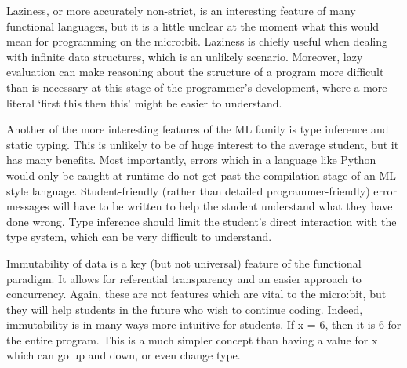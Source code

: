 \documentclass[12pt, a4paper]{report}
\begin{document}
Laziness, or more accurately non-\gls{strict}, is an interesting feature of many functional languages, 
but it is a little unclear at the moment what this would mean for programming on the micro:bit. 
Laziness is chiefly useful when dealing with infinite data structures, which is an unlikely
scenario. Moreover, lazy evaluation can make reasoning about the structure of a program more
difficult than is necessary at this stage of the programmer's development, where a more literal
`first this then this' might be easier to understand. 

Another of the more interesting features of the ML family is type inference and static typing.
This is unlikely to be of huge interest to the average student, but it has many benefits. Most
importantly, errors which in a language like Python would only be caught at runtime do not get
past the compilation stage of an ML-style language. Student-friendly (rather than detailed
programmer-friendly) error messages will have to be written to help the student understand what they
have done wrong. Type inference should limit the student's direct interaction with the type system,
which can be very difficult to understand.

Immutability of data is a key (but not universal) feature of the functional paradigm. It allows for
referential transparency and an easier approach to concurrency. Again, these are not features which
are vital to the micro:bit, but they will help students in the future who wish to continue 
coding. Indeed, immutability is in many ways more intuitive for students. If x = 6, then it is 6 for
the entire program. This is a much simpler concept than having a value for x which can go up and down,
or even change type.
\end{document}
